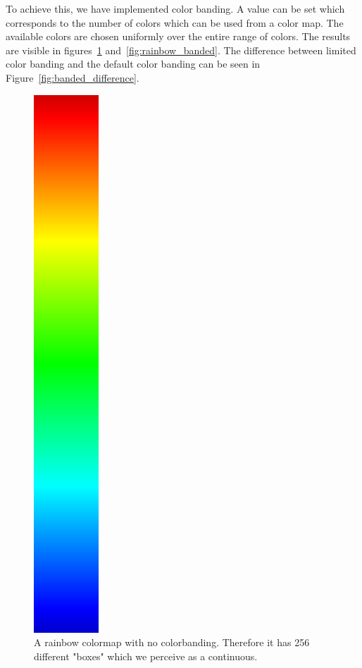 		To achieve this, we have implemented color banding. 
		A value can be set which corresponds to the number of colors which can be used from a color map.
		The available colors are chosen uniformly over the entire range of colors.
		The results are visible in figures~\ref{fig:rainbow} and~\ref{fig:rainbow_banded}.
		The difference between limited color banding and the default color banding can be seen in Figure~\ref{fig:banded_difference}.
		\begin{figure}[htb]
			  \centering
			  \includegraphics[angle=270, width=\linewidth, totalheight=1em, frame]{./content/pictures/rainbow.png}
			  \caption{A rainbow colormap with no colorbanding. Therefore it has 256 different "boxes" which we perceive as a continuous. }
			  \label{fig:rainbow}
		\end{figure}
